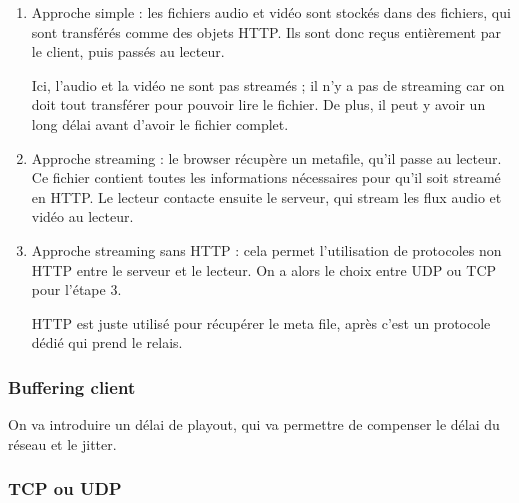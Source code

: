 		\begin{enumerate}
			\item Approche simple : les fichiers audio et vidéo sont stockés dans des fichiers, qui sont transférés comme des objets HTTP. Ils sont donc reçus entièrement par le client, puis passés au lecteur.
			
			
			Ici, l'audio et la vidéo ne sont pas streamés ; il n'y a pas de streaming car on doit tout transférer pour pouvoir lire le fichier. De plus, il peut y avoir un long délai avant d'avoir le fichier complet.
			
			\item Approche streaming : le browser récupère un metafile, qu'il passe au lecteur. Ce fichier contient toutes les informations nécessaires pour qu'il soit streamé en HTTP. Le lecteur contacte ensuite le serveur, qui stream les flux audio et vidéo au lecteur.
			
						
			\item Approche streaming sans HTTP : cela permet l'utilisation de protocoles non HTTP entre le serveur et le lecteur. On a alors le choix entre UDP ou TCP pour l'étape 3.
			
			
			HTTP est juste utilisé pour récupérer le meta file, après c'est un protocole dédié qui prend le relais.
		
		\end{enumerate}
		
			\subsubsection{Buffering client}
		
			On va introduire un délai de playout, qui va permettre de compenser le délai du réseau et le jitter.
			
		
		
			\subsubsection{TCP ou UDP}
			
			
				
